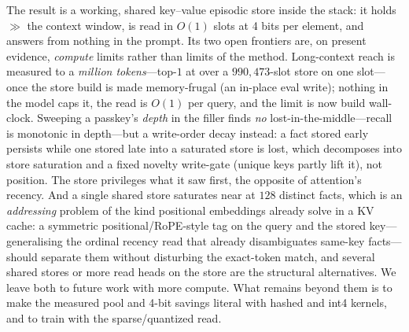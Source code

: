 The result is a working, shared key--value episodic store inside the stack: it holds
$\gg$ the context window, is read in $O(1)$ slots at 4 bits per element, and answers
from nothing in the prompt. Its two open frontiers are, on present evidence,
\emph{compute} limits rather than limits of the method. Long-context reach is measured to a
\emph{million tokens}---top-$1$ at  over a $990{,}473$-slot store on one slot---once
the store build is made memory-frugal (an in-place eval write); nothing in the model caps it,
the read is $O(1)$ per query, and the limit is now build wall-clock. Sweeping a passkey's
\emph{depth} in the filler finds \emph{no} lost-in-the-middle---recall is monotonic in
depth---but a write-order decay instead: a fact stored early persists while one stored late
into a saturated store is lost, which decomposes into store saturation and a fixed novelty
write-gate (unique keys partly lift it), not position. The store privileges what it saw
first, the opposite of attention's recency. And a single shared store
saturates near
 at $128$ distinct facts, which is an \emph{addressing} problem of the kind
positional embeddings already solve in a KV cache: a symmetric positional/RoPE-style tag on
the query and the stored key---generalising the ordinal recency read that already
disambiguates same-key facts---should separate them without disturbing the exact-token match,
and several shared stores or more read heads on the store are the structural alternatives. We
leave both to future work with more compute. What remains beyond them is to make the measured
pool and 4-bit savings literal with hashed and int4 kernels, and to train with the
sparse/quantized read.
